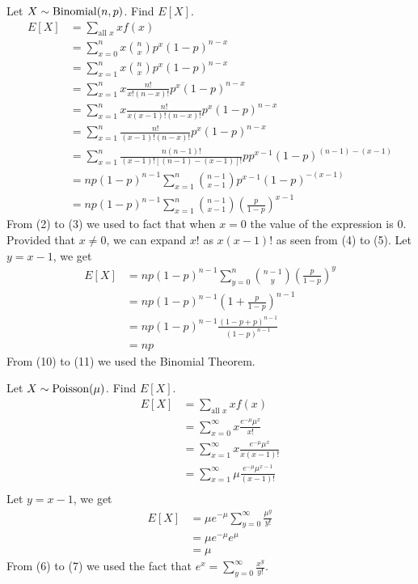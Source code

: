Let $ X \sim \operatorname{Binomial}(n,p) $. Find $ E[X] $.
\setcounter{equation}{0}
\begin{align}
    E[X] & =\sum\limits_{\text{all } x}x f(x)                                                    \\
         & =\sum\limits_{x=0}^{n}x \binom{n}{x}p^x(1-p)^{n-x}                                    \\
         & =\sum\limits_{x=1}^{n}x \binom{n}{x}p^x(1-p)^{n-x}                                    \\
         & =\sum\limits_{x=1}^{n}x \frac{n!}{x!(n-x)!}p^x(1-p)^{n-x}                             \\
         & =\sum\limits_{x=1}^{n}x \frac{n!}{x(x-1)!(n-x)!}p^x(1-p)^{n-x}                        \\
         & =\sum\limits_{x=1}^{n}\frac{n!}{(x-1)!(n-x)!}p^x(1-p)^{n-x}                           \\
         & =\sum\limits_{x=1}^{n}\frac{n(n-1)!}{(x-1)![(n-1)-(x-1)]!}pp^{x-1}(1-p)^{(n-1)-(x-1)} \\
         & =np(1-p)^{n-1}\sum\limits_{x=1}^{n}\binom{n-1}{x-1}p^{x-1}(1-p)^{-(x-1)}              \\
         & =np(1-p)^{n-1}\sum\limits_{x=1}^{n}\binom{n-1}{x-1}\left(\frac{p}{1-p}\right)^{x-1}
\end{align}
From (2) to (3) we used to fact that when $ x=0 $ the value of the expression
is $ 0 $. Provided that $ x\neq 0 $, we can expand $ x! $ as $ x(x-1)! $ as
seen from (4) to (5). Let $ y=x-1 $, we get
\begin{align}
    E[X] & =np(1-p)^{n-1}\sum\limits_{y=0}^{n}\binom{n-1}{y}\left(\frac{p}{1-p}\right)^{y} \\
         & =np(1-p)^{n-1}\left(1+\frac{p}{1-p}\right)^{n-1}                                \\
         & =np(1-p)^{n-1}\frac{(1-p+p)^{n-1}}{(1-p)^{n-1}}                                 \\
         & =np
\end{align}
From (10) to (11) we used the Binomial Theorem.

Let $ X \sim \operatorname{Poisson}(\mu) $. Find $ E[X] $.
\setcounter{equation}{0}
\begin{align}
    E[X] & =\sum\limits_{\text{all } x}x f(x)                               \\
         & =\sum\limits_{x=0}^{\infty} x \frac{e^{-\mu}\mu^x}{x!}           \\
         & =\sum\limits_{x=1}^{\infty} x \frac{e^{-\mu}\mu^x}{x(x-1)!}      \\
         & =\sum\limits_{x=1}^{\infty} \mu \frac{e^{-\mu}\mu^{x-1}}{(x-1)!} \\
\end{align}
Let $ y=x-1 $, we get
\begin{align}
    E[X] & =\mu e^{-\mu}\sum\limits_{y=0}^{\infty} \frac{\mu^{y}}{y!} \\
         & =\mu e^{-\mu}e^\mu                                         \\
         & =\mu
\end{align}
From (6) to (7) we used the fact that $ e^x=\sum\limits_{y=0}^{\infty}\frac{x^y}{y!} $.

